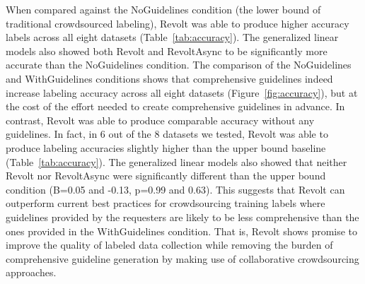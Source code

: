 When compared against the NoGuidelines condition (the lower bound of traditional crowdsourced labeling), Revolt was able to produce higher accuracy labels across all eight datasets (Table~\ref{tab:accuracy}). 
The generalized linear models also showed both Revolt and RevoltAsync to be significantly more accurate than the NoGuidelines condition.
The comparison of the NoGuidelines and WithGuidelines conditions shows that comprehensive guidelines indeed increase labeling accuracy across all eight datasets (Figure~\ref{fig:accuracy}), but at the cost of the effort needed to create comprehensive guidelines in advance. 
In contrast, Revolt was able to produce comparable accuracy without any guidelines. In fact, in 6 out of the 8 datasets we tested, Revolt was able to produce labeling accuracies slightly higher than the upper bound baseline 
(Table~\ref{tab:accuracy}). The generalized linear models also showed that neither Revolt nor RevoltAsync were significantly different than the upper bound condition (B=0.05 and -0.13, p=0.99 and 0.63).
This suggests that Revolt can outperform current best practices for crowdsourcing training labels where guidelines provided by the requesters are likely to be less comprehensive than the ones provided in the WithGuidelines condition. That is, Revolt shows promise to improve the quality of labeled data collection while removing the burden of comprehensive guideline generation by making use of collaborative crowdsourcing approaches.





